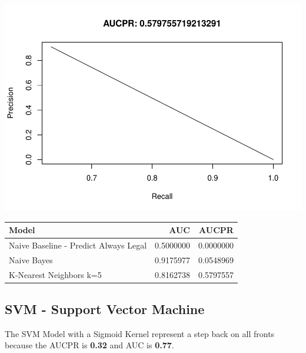 \documentclass[]{article}
\begin{document}
\begin{center}\includegraphics{Credit_Card_Fraud_Detection_Project_Report_files/figure-latex/unnamed-chunk-18-3} \end{center}

\begin{table}[H]
\centering\begingroup\fontsize{10}{12}\selectfont

\begin{tabular}{l|r|r}
\hline
Model & AUC & AUCPR\\
\hline
Naive Baseline - Predict Always Legal & 0.5000000 & 0.0000000\\
\hline
Naive Bayes & 0.9175977 & 0.0548969\\
\hline
K-Nearest Neighbors k=5 & 0.8162738 & 0.5797557\\
\hline
\end{tabular}
\endgroup{}
\end{table}
\newpage

\hypertarget{svm---support-vector-machine}{%
\subsection{SVM - Support Vector
Machine}\label{svm---support-vector-machine}}

The SVM Model with a Sigmoid Kernel represent a step back on all fronts
because the AUCPR is \textbf{0.32} and AUC is \textbf{0.77}.
\end{document}
